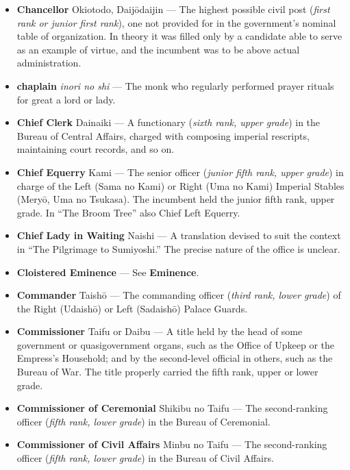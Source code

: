 \documentclass{article}
\begin{document}
\begin{multicols}{2}
\begin{small}
\begin{itemize}[
				label=,
				leftmargin=0em,
				rightmargin=-1.5em,
				itemindent=-2em,
			]
			\item \textbf{Chancellor} Okiotodo, Daijōdaijin --- The highest possible civil post (\textit{first rank or junior first rank}), one not provided for in the government's nominal table of organization. In theory it was filled only by a candidate able to serve as an example of virtue, and the incumbent was to be above actual administration.

			\item \textbf{chaplain} \textit{inori no shi} --- The monk who regularly performed prayer rituals for great a lord or lady.

			\item \textbf{Chief Clerk} Dainaiki --- A functionary (\textit{sixth rank, upper grade}) in the Bureau of Central Affairs, charged with composing imperial rescripts, maintaining court records, and so on.

			\item \textbf{Chief Equerry} Kami --- The senior officer (\textit{junior fifth rank, upper grade}) in charge of the Left (Sama no Kami) or Right (Uma no Kami) Imperial Stables (Meryō, Uma no Tsukasa). The incumbent held the junior fifth rank, upper grade. In “The Broom Tree” also Chief Left Equerry.

			\item \textbf{Chief Lady in Waiting} Naishi --- A translation devised to suit the context in “The Pilgrimage to Sumiyoshi.” The precise nature of the office is unclear.

			\item \textbf{Cloistered Eminence} --- See \textbf{Eminence}.

			\item \textbf{Commander} Taishō --- The commanding officer (\textit{third rank, lower grade}) of the Right (Udaishō) or Left (Sadaishō) Palace Guards.

			\item \textbf{Commissioner} Taifu or Daibu --- A title held by the head of some government or quasigovernment organs, such as the Office of Upkeep or the Empress's Household; and by the second-level official in others, such as the Bureau of War. The title properly carried the fifth rank, upper or lower grade.

			\item \textbf{Commissioner of Ceremonial} Shikibu no Taifu --- The second-ranking officer (\textit{fifth rank, lower grade}) in the Bureau of Ceremonial.

			\item \textbf{Commissioner of Civil Affairs} Minbu no Taifu --- The second-ranking officer (\textit{fifth rank, lower grade}) in the Bureau of Civil Affairs.


\end{itemize}
\end{small}
\end{multicols}
\end{document}
